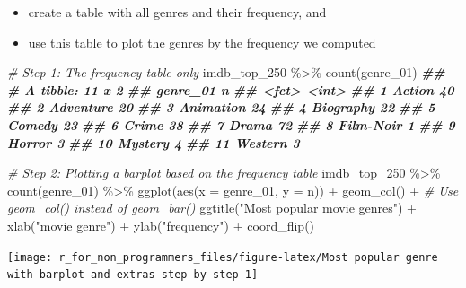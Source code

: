 \documentclass[
]{book}
\newenvironment{Shaded}{\begin{snugshade}}{\end{snugshade}}
\newcommand{\AttributeTok}[1]{\textcolor[rgb]{0.77,0.63,0.00}{#1}}
\newcommand{\CommentTok}[1]{\textcolor[rgb]{0.56,0.35,0.01}{\textit{#1}}}
\newcommand{\DocumentationTok}[1]{\textcolor[rgb]{0.56,0.35,0.01}{\textbf{\textit{#1}}}}
\newcommand{\FunctionTok}[1]{\textcolor[rgb]{0.00,0.00,0.00}{#1}}
\newcommand{\NormalTok}[1]{#1}
\newcommand{\SpecialCharTok}[1]{\textcolor[rgb]{0.00,0.00,0.00}{#1}}
\newcommand{\StringTok}[1]{\textcolor[rgb]{0.31,0.60,0.02}{#1}}
\begin{document}
\begin{itemize}
\item
  create a table with all genres and their frequency, and
\item
  use this table to plot the genres by the frequency we computed
\end{itemize}

\begin{Shaded}
\begin{Highlighting}[]

\CommentTok{\# Step 1: The frequency table only}
\NormalTok{imdb\_top\_250 }\SpecialCharTok{\%\textgreater{}\%} 
  \FunctionTok{count}\NormalTok{(genre\_01)}
\DocumentationTok{\#\# \# A tibble: 11 x 2}
\DocumentationTok{\#\#    genre\_01      n}
\DocumentationTok{\#\#    \textless{}fct\textgreater{}     \textless{}int\textgreater{}}
\DocumentationTok{\#\#  1 Action       40}
\DocumentationTok{\#\#  2 Adventure    20}
\DocumentationTok{\#\#  3 Animation    24}
\DocumentationTok{\#\#  4 Biography    22}
\DocumentationTok{\#\#  5 Comedy       23}
\DocumentationTok{\#\#  6 Crime        38}
\DocumentationTok{\#\#  7 Drama        72}
\DocumentationTok{\#\#  8 Film{-}Noir     1}
\DocumentationTok{\#\#  9 Horror        3}
\DocumentationTok{\#\# 10 Mystery       4}
\DocumentationTok{\#\# 11 Western       3}

\CommentTok{\# Step 2: Plotting a barplot based on the frequency table}
\NormalTok{imdb\_top\_250 }\SpecialCharTok{\%\textgreater{}\%} 
  \FunctionTok{count}\NormalTok{(genre\_01) }\SpecialCharTok{\%\textgreater{}\%} 
  \FunctionTok{ggplot}\NormalTok{(}\FunctionTok{aes}\NormalTok{(}\AttributeTok{x =}\NormalTok{ genre\_01, }\AttributeTok{y =}\NormalTok{ n)) }\SpecialCharTok{+}
  \FunctionTok{geom\_col}\NormalTok{() }\SpecialCharTok{+}                             \CommentTok{\# Use geom\_col() instead of geom\_bar()}
  \FunctionTok{ggtitle}\NormalTok{(}\StringTok{"Most popular movie genres"}\NormalTok{) }\SpecialCharTok{+}
  \FunctionTok{xlab}\NormalTok{(}\StringTok{"movie genre"}\NormalTok{) }\SpecialCharTok{+}
  \FunctionTok{ylab}\NormalTok{(}\StringTok{"frequency"}\NormalTok{) }\SpecialCharTok{+}
  \FunctionTok{coord\_flip}\NormalTok{()}
\end{Highlighting}
\end{Shaded}

\begin{center}\texttt{[image: r\_for\_non\_programmers\_files/figure-latex/Most popular genre with barplot and extras step-by-step-1]} \end{center}
\end{document}
